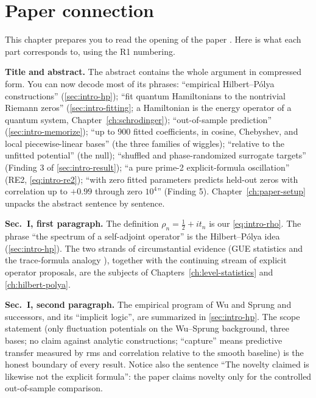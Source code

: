 \section{Paper connection}\label{sec:intro-paper}

This chapter prepares you to read the opening of the paper \cite{soniR1}. Here is what each part corresponds to, using the R1 numbering.

\textbf{Title and abstract.} The abstract contains the whole argument in compressed form. You can now decode most of its phrases: ``empirical Hilbert--P\'olya constructions'' (\cref{sec:intro-hp}); ``fit quantum Hamiltonians to the nontrivial Riemann zeros'' (\cref{sec:intro-fitting}; a Hamiltonian is the energy operator of a quantum system, Chapter~\ref{ch:schrodinger}); ``out-of-sample prediction'' (\cref{sec:intro-memorize}); ``up to 900 fitted coefficients, in cosine, Chebyshev, and local piecewise-linear bases'' (the three families of wiggles); ``relative to the unfitted potential'' (the null); ``shuffled and phase-randomized surrogate targets'' (Finding 3 of \cref{sec:intro-result}); ``a pure prime-2 explicit-formula oscillation'' (RE2, \cref{eq:intro-re2}); ``with zero fitted parameters predicts held-out zeros with correlation up to $+0.99$ through zero $10^4$'' (Finding 5). Chapter~\ref{ch:paper-setup} unpacks the abstract sentence by sentence.

\textbf{Sec.~I, first paragraph.} The definition $\rho_n = \tfrac12 + i t_n$ is our \cref{eq:intro-rho}. The phrase ``the spectrum of a self-adjoint operator'' is the Hilbert--P\'olya idea (\cref{sec:intro-hp}). The two strands of circumstantial evidence (GUE statistics \cite{montgomery,odlyzko87} and the trace-formula analogy \cite{berrykeating99,schumayer}), together with the continuing stream of explicit operator proposals, are the subjects of Chapters~\ref{ch:level-statistics} and \ref{ch:hilbert-polya}.

\textbf{Sec.~I, second paragraph.} The empirical program of Wu and Sprung \cite{wusprung} and successors, and its ``implicit logic'', are summarized in \cref{sec:intro-hp}. The scope statement (only fluctuation potentials on the Wu--Sprung background, three bases; no claim against analytic constructions; ``capture'' means predictive transfer measured by rms and correlation relative to the smooth baseline) is the honest boundary of every result. Notice also the sentence ``The novelty claimed is likewise not the explicit formula'': the paper claims novelty only for the controlled out-of-sample comparison.


